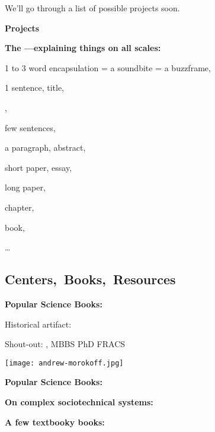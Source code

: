\begin{frame}[plain]
    We'll go through a list of possible projects soon.
  
  


  \textbf{Projects}

  \textbf{The ---explaining things on all scales:}
    
     
      1 to 3 word encapsulation = a soundbite = a buzzframe,
     
      1 sentence, title,
     
      ,
     
      few sentences,
     
      a paragraph, abstract,
     
      short paper, essay,
     
      long paper,
     
      chapter,
     
      book,
     
      \ldots
    
  



\subsection{Centers,\ Books,\ Resources}

  \textbf{Popular Science Books:}

  Historical artifact:
  \bigskip
  \bigskip
  
      
    
          
      Shout-out:
      , \newline
      MBBS PhD FRACS 
      
      \texttt{[image: andrew-morokoff.jpg]}
      

  \textbf{Popular Science Books:}

  \medskip
  \medskip


  \textbf{On complex sociotechnical systems:}

  \medskip
  \medskip


  \textbf{A few textbooky books:}


\end{frame}
